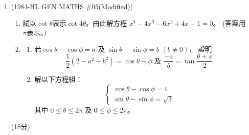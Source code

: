 \documentclass[12pt]{article}
\begin{document}
\begin{enumerate}
        \pagebreak
        \item (1984-HL GEN MATHS \#05(Modified)) \begin{enumerate}
            \item 試以$\cot{\theta}$表示$\cot{4\theta}$。由此解方程 $x^4-4x^3-6x^2+4x+1=0$。 (答案用 $\pi$表示。)
            \item \begin{enumerate}
                \item 若$\cos{\theta}-\cos{\phi}=a$ 及 $\sin{\theta}-\sin{\phi}=b$ $(b\neq 0)$， 證明 $$\frac{1}{2}(2-a^2-b^2)=\cos{\theta-\phi}\textrm{ 及 }\frac{-a}{b}=\tan{\frac{\theta+\phi}{2}}.$$
                \item 解以下方程組： $$\begin{cases}
                    \cos{\theta}-\cos{\phi}=1\\
                    \sin{\theta}-\sin{\phi}=\sqrt{3}
                \end{cases}$$
                其中 $0\leq \theta \leq 2\pi$ 及 $0\leq \phi \leq 2\pi$。
            \end{enumerate}
        \end{enumerate}\hfill(18分)

        \hrulefill
            
            \hrulefill
            
            \hrulefill
            
            \hrulefill
            
            \hrulefill
            
            \hrulefill
            
            \hrulefill
            
            \hrulefill
            
            \hrulefill
            
            \hrulefill
            
            \hrulefill
            
            \hrulefill
            
            \hrulefill
            
            \hrulefill
            
            \hrulefill
            
            \hrulefill
            
            \hrulefill
            
            \hrulefill
            

\end{enumerate}
\end{document}
